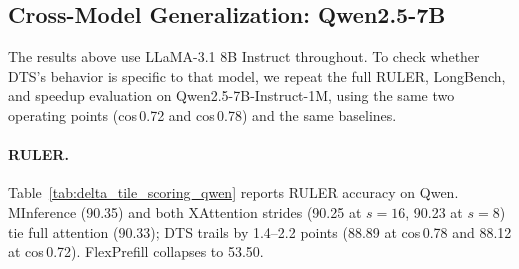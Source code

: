 \begin{table}[!ht]
\centering
\caption{End-to-end prefill speedup (128K tokens) and accuracy (\%) on RULER and LongBench for DTS cosine thresholds on LLaMA-3.1 8B Instruct. Attention density is the fraction of computed sparse attention. Score\% represents the scoring overhead. Score ms and Attn ms indicate the respective phase latencies.}
\label{tab:cos_ablation}
\end{table}
\subsection{Cross-Model Generalization: Qwen2.5-7B}
\label{sec:results_qwen}

The results above use LLaMA-3.1 8B Instruct throughout. To check whether DTS's behavior is specific to that model, we repeat the full RULER, LongBench, and speedup evaluation on Qwen2.5-7B-Instruct-1M, using the same two operating points (cos\,0.72 and cos\,0.78) and the same baselines.


\paragraph{RULER.}

Table~\ref{tab:delta_tile_scoring_qwen} reports RULER accuracy on Qwen. MInference (90.35) and both XAttention strides (90.25 at $s{=}16$, 90.23 at $s{=}8$) tie full attention (90.33); DTS trails by 1.4--2.2 points (88.89 at cos\,0.78 and 88.12 at cos\,0.72). FlexPrefill collapses to 53.50.

